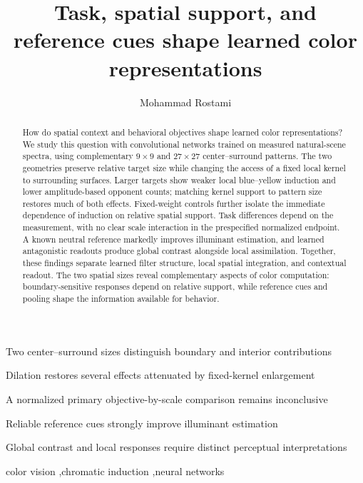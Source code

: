 \documentclass[authoryear,preprint,review,12pt]{elsarticle}
\begin{document}
\begingroup
\renewcommand{\baselinestretch}{1}\selectfont
\begin{frontmatter}
\title{Task, spatial support, and reference cues shape learned color representations}
\author[inst1]{Mohammad Rostami}
\begin{abstract}
How do spatial context and behavioral objectives shape learned color representations? We study this question with convolutional networks trained on measured natural-scene spectra, using complementary $9\times9$ and $27\times27$ center--surround patterns. The two geometries preserve relative target size while changing the access of a fixed local kernel to surrounding surfaces. Larger targets show weaker local blue--yellow induction and lower amplitude-based opponent counts; matching kernel support to pattern size restores much of both effects. Fixed-weight controls further isolate the immediate dependence of induction on relative spatial support. Task differences depend on the measurement, with no clear scale interaction in the prespecified normalized endpoint. A known neutral reference markedly improves illuminant estimation, and learned antagonistic readouts produce global contrast alongside local assimilation. Together, these findings separate learned filter structure, local spatial integration, and contextual readout. The two spatial sizes reveal complementary aspects of color computation: boundary-sensitive responses depend on relative support, while reference cues and pooling shape the information available for behavior.
\end{abstract}
\begin{highlights}
\item Two center--surround sizes distinguish boundary and interior contributions
\item Dilation restores several effects attenuated by fixed-kernel enlargement
\item A normalized primary objective-by-scale comparison remains inconclusive
\item Reliable reference cues strongly improve illuminant estimation
\item Global contrast and local responses require distinct perceptual interpretations
\end{highlights}
\begin{keyword}
color vision \sep chromatic induction \sep neural networks
\end{keyword}
\end{frontmatter}
\endgroup
\linenumbers
\end{document}
